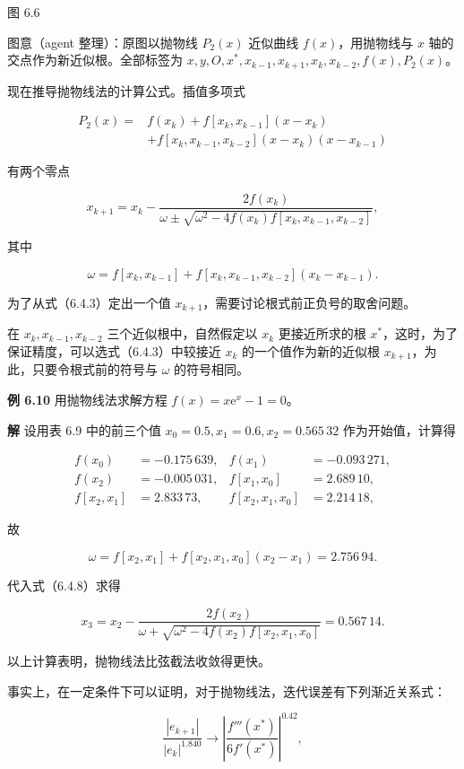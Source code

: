 图 6.6

图意（agent 整理）：原图以抛物线 \(P_2(x)\) 近似曲线 \(f(x)\)，用抛物线与 \(x\) 轴的交点作为新近似根。全部标签为 \(x,\allowbreak y,\allowbreak O,\allowbreak x^*,\allowbreak x_{k-1},\allowbreak x_{k+1},\allowbreak x_k,\allowbreak x_{k-2},\allowbreak f(x),\allowbreak P_2(x)\)。

现在推导抛物线法的计算公式。插值多项式

\[
\begin{aligned}
P_2(x)={}&f(x_k)+f[x_k,x_{k-1}](x-x_k)\\
&+f[x_k,x_{k-1},x_{k-2}](x-x_k)(x-x_{k-1})
\end{aligned}
\]

有两个零点

\[
x_{k+1}=x_k-\frac{2f(x_k)}{\omega\pm\sqrt{\omega^2-4f(x_k)f[x_k,x_{k-1},x_{k-2}]}},
\tag{6.4.3}
\]

其中

\[
\omega=f[x_k,x_{k-1}]+f[x_k,x_{k-1},x_{k-2}](x_k-x_{k-1}).
\]

为了从式（6.4.3）定出一个值 \(x_{k+1}\)，需要讨论根式前正负号的取舍问题。

在 \(x_k,x_{k-1},x_{k-2}\) 三个近似根中，自然假定以 \(x_k\) 更接近所求的根 \(x^*\)，这时，为了保证精度，可以选式（6.4.3）中较接近 \(x_k\) 的一个值作为新的近似根 \(x_{k+1}\)，为此，只要令根式前的符号与 \(\omega\) 的符号相同。

\textbf{例 6.10} 用抛物线法求解方程 \(f(x)=x\mathrm{e}^x-1=0\)。

\textbf{解} 设用表 6.9 中的前三个值 \(x_0=0.5,x_1=0.6,x_2=0.565\,32\) 作为开始值，计算得

\[
\begin{aligned}
f(x_0)&=-0.175\,639,& f(x_1)&=-0.093\,271,\\
f(x_2)&=-0.005\,031,& f[x_1,x_0]&=2.689\,10,\\
f[x_2,x_1]&=2.833\,73,& f[x_2,x_1,x_0]&=2.214\,18,
\end{aligned}
\]

故

\[
\omega=f[x_2,x_1]+f[x_2,x_1,x_0](x_2-x_1)=2.756\,94.
\]

代入式（6.4.8）求得

\[
x_3=x_2-\frac{2f(x_2)}{\omega+\sqrt{\omega^2-4f(x_2)f[x_2,x_1,x_0]}}=0.567\,14.
\]

以上计算表明，抛物线法比弦截法收敛得更快。

事实上，在一定条件下可以证明，对于抛物线法，迭代误差有下列渐近关系式：

\[
\frac{|e_{k+1}|}{|e_k|^{1.840}}\to\left|\frac{f'''(x^*)}{6f'(x^*)}\right|^{0.42},
\]

